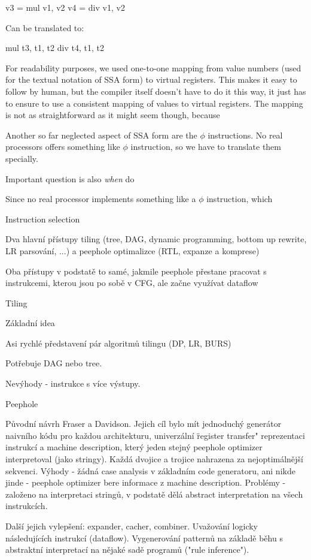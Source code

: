 \begtt
v3 = mul v1, v2
v4 = div v1, v2
\endtt

Can be translated to:

\begtt
mul t3, t1, t2
div t4, t1, t2
\endtt

For readability purposes, we used one-to-one mapping from value numbers (used
for the textual notation of SSA form) to virtual registers. This makes it easy
to follow by human, but the compiler itself doesn't have to do it this way, it
just has to ensure to use a consistent mapping of values to virtual registers.
The mapping is not as straightforward as it might seem though, because 

Another so far neglected aspect of SSA form are the $\phi$ instructions. No real
processors offers something like $\phi$ instruction, so we have to translate
them specially.

Important question is also {\em when} do 


Since no real processor implements something like a $\phi$ instruction, which 

\sec Instruction selection

Dva hlavní přístupy tiling (tree, DAG, dynamic programming, bottom up rewrite,
LR parsování, ...) a peephole optimalizce (RTL, expanze a komprese)

Oba přístupy v podstatě to samé, jakmile peephole přestane pracovat s
instrukcemi, kterou jsou po sobě v CFG, ale začne využívat dataflow

\sec Tiling

Základní idea

Asi rychlé představení pár algoritmů tilingu (DP, LR, BURS)

Potřebuje DAG nebo tree.

Nevýhody - instrukce s více výstupy.

\sec Peephole

Původní návrh Fraser a Davidson. Jejich cíl bylo mít jednoduchý generátor
naivního kódu pro každou architekturu, univerzální \"register transfer"
reprezentaci instrukcí a machine description, který jeden stejný peephole
optimizer interpretoval (jako stringy). Každá dvojice a trojice nahrazena za
nejoptimálnější sekvenci. Výhody - žádná case analysis v základním code
generatoru, ani nikde jinde - peephole optimizer bere informace z machine
description. Problémy - založeno na interpretaci stringů, v podstatě dělá
abstract interpretation na všech instrukcích.

Další jejich vylepšení: expander, cacher, combiner. Uvažování logicky
následujících instrukcí (dataflow). Vygenerování patternů na
základě běhu s abstraktní interpretací na nějaké sadě programů ("rule
inference").

